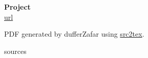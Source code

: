 \documentclass{article}
\begin{document}

\title{}
\author{Shadab Zafar}

\begin{titlepage}
   \begin{center}
    \Huge
    \textbf{Project} \\


    \LARGE
    \href{url}{url}


    \large
    PDF generated by dufferZafar using \href{http://github.com/dufferzafar/src2tex}{src2tex}.
   \end{center}
\end{titlepage}

\newpage



{{sources}}

\end{document}

